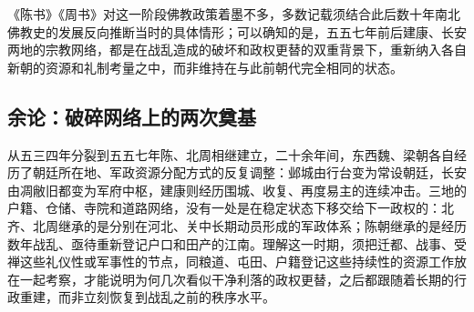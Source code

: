 《陈书》《周书》对这一阶段佛教政策着墨不多，多数记载须结合此后数十年南北佛教史的发展反向推断当时的具体情形；可以确知的是，五五七年前后建康、长安两地的宗教网络，都是在战乱造成的破坏和政权更替的双重背景下，重新纳入各自新朝的资源和礼制考量之中，而非维持在与此前朝代完全相同的状态。

\subsection{余论：破碎网络上的两次奠基}

从五三四年分裂到五五七年陈、北周相继建立，二十余年间，东西魏、梁朝各自经历了朝廷所在地、军政资源分配方式的反复调整：邺城由行台变为常设朝廷，长安由凋敝旧都变为军府中枢，建康则经历围城、收复、再度易主的连续冲击。三地的户籍、仓储、寺院和道路网络，没有一处是在稳定状态下移交给下一政权的：北齐、北周继承的是分别在河北、关中长期动员形成的军政体系；陈朝继承的是经历数年战乱、亟待重新登记户口和田产的江南。理解这一时期，须把迁都、战事、受禅这些礼仪性或军事性的节点，同粮道、屯田、户籍登记这些持续性的资源工作放在一起考察，才能说明为何几次看似干净利落的政权更替，之后都跟随着长期的行政重建，而非立刻恢复到战乱之前的秩序水平。
